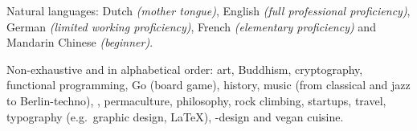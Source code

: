\documentclass[10pt,a4paper]{article}
\begin{document}
    \vspace{0.5em}
    \inlineheadsection
      {Natural languages:}
      {Dutch \emph{(mother tongue)}, English \emph{(full professional proficiency)}, German \emph{(limited working proficiency)}, French \emph{(elementary proficiency)} and Mandarin Chinese \emph{(beginner)}.}
    
    
    \spacedhrule{1.6em}{-0.4em}
    
    
    \inlineheadsection
      {Non-exhaustive and in alphabetical order:}
      {art, Buddhism, cryptography, functional programming, Go (board game), history, music (from classical and jazz to Berlin-techno), , permaculture, philosophy, rock climbing, startups, travel, typography (e.g.\ graphic design, \LaTeX), -design and vegan cuisine.}
    
    
    
\end{document}
